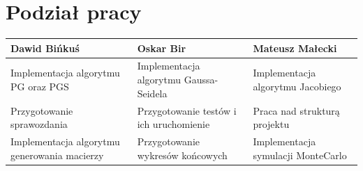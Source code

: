 \documentclass[10pt]{article}
\begin{document}
\section{Podział pracy}
\centering
	\begin{tabular}{| p{5cm} | p{5cm} | p{5cm} |}
		\hline
		\textbf{Dawid Bińkuś} & \textbf{Oskar Bir} & \textbf{Mateusz Małecki} \\ \hline
		Implementacja algorytmu PG oraz PGS & Implementacja algorytmu Gaussa-Seidela & Implementacja algorytmu Jacobiego \\ \hline
		Przygotowanie sprawozdania & Przygotowanie testów i ich uruchomienie & Praca nad strukturą projektu \\ \hline
		Implementacja algorytmu generowania macierzy & Przygotowanie wykresów końcowych &Implementacja symulacji MonteCarlo\\ \hline
		
		
		
	\end{tabular}
\end{document}
